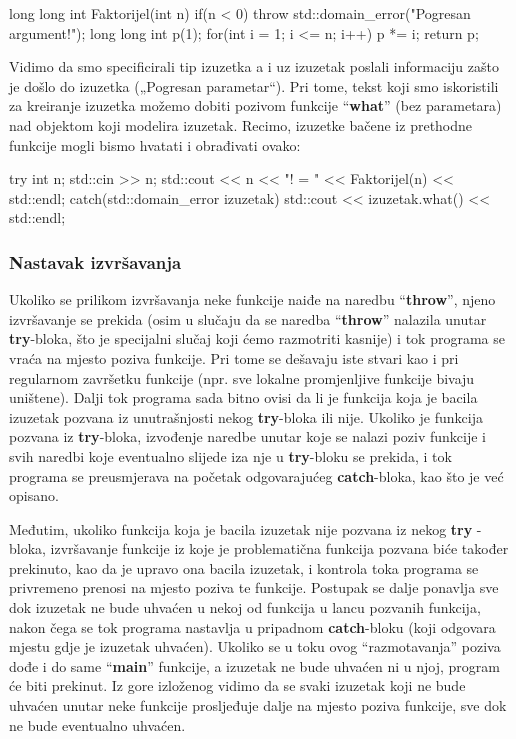 \documentclass[11pt]{book}
\begin{document}
\begin{shortlisting}
  long long int Faktorijel(int n) {
      if(n < 0) throw std::domain_error("Pogresan argument!");
      long long int p(1);
      for(int i = 1; i <= n; i++) p *= i;
      return p;
    }
\end{shortlisting}

Vidimo da smo specificirali tip izuzetka a i uz izuzetak poslali informaciju zašto je došlo do izuzetka („Pogresan parametar“). Pri tome, tekst koji smo iskoristili za kreiranje izuzetka možemo dobiti pozivom funkcije “\textbf{what}” (bez parametara) nad objektom koji modelira izuzetak. Recimo, izuzetke bačene iz prethodne funkcije mogli bismo hvatati i obrađivati ovako:

\begin{shortlisting}
  try {
      int n;
      std::cin >> n;
      std::cout << n << "! = " << Faktorijel(n) << std::endl;
    }
  catch(std::domain_error izuzetak) {
      std::cout << izuzetak.what() << std::endl;
    }
\end{shortlisting}
\subsubsection{Nastavak izvršavanja}
Ukoliko se prilikom izvršavanja neke funkcije naiđe na naredbu “\textbf{throw}”, njeno izvršavanje se prekida (osim u slučaju da se naredba “\textbf{throw}” nalazila unutar \textbf{try}-bloka, što je specijalni slučaj koji ćemo razmotriti kasnije) i tok programa se vraća na mjesto poziva funkcije. Pri tome se dešavaju iste stvari kao i pri regularnom završetku funkcije  (npr.  sve  lokalne  promjenljive funkcije bivaju uništene). Dalji tok programa sada bitno ovisi da li je funkcija koja je bacila izuzetak pozvana iz unutrašnjosti nekog \textbf{try}-bloka ili nije. Ukoliko je funkcija pozvana iz \textbf{try}-bloka, izvođenje naredbe unutar koje se nalazi poziv funkcije i svih naredbi koje eventualno slijede iza nje u \textbf{try}-bloku se  prekida, i tok programa se preusmjerava na početak odgovarajućeg \textbf{catch}-bloka, kao što je već opisano.

Međutim, ukoliko funkcija koja je bacila izuzetak nije pozvana iz nekog \textbf{try} -bloka, izvršavanje funkcije iz koje je problematična funkcija pozvana biće također prekinuto, kao da je upravo ona bacila izuzetak, i kontrola toka programa se  privremeno  prenosi  na  mjesto  poziva  te  funkcije.  Postupak  se  dalje  ponavlja  sve  dok
izuzetak ne bude uhvaćen u nekoj od funkcija u lancu pozvanih funkcija, nakon čega se tok programa nastavlja u pripadnom \textbf{catch}-bloku (koji odgovara mjestu gdje je izuzetak uhvaćen). Ukoliko se u toku ovog “razmotavanja” poziva dođe i do same “\textbf{main}” funkcije, a izuzetak ne bude uhvaćen ni u njoj, program će biti prekinut. Iz gore izloženog vidimo da se svaki izuzetak koji ne bude uhvaćen unutar neke funkcije prosljeđuje dalje na mjesto poziva funkcije, sve dok ne bude eventualno uhvaćen.
\end{document}
